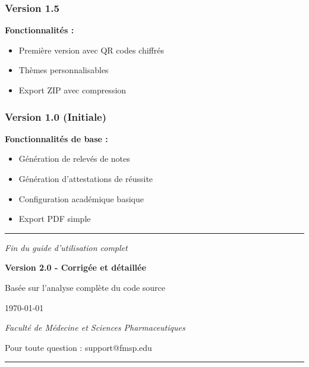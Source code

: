 \subsubsection{Version 1.5}

\textbf{Fonctionnalités :}
\begin{itemize}[leftmargin=*]
    \item Première version avec QR codes chiffrés
    \item Thèmes personnalisables
    \item Export ZIP avec compression
\end{itemize}

\subsubsection{Version 1.0 (Initiale)}

\textbf{Fonctionnalités de base :}
\begin{itemize}[leftmargin=*]
    \item Génération de relevés de notes
    \item Génération d'attestations de réussite
    \item Configuration académique basique
    \item Export PDF simple
\end{itemize}

\vfill

\begin{center}
\rule{\textwidth}{0.4pt}

\vspace{0.5cm}

\textit{Fin du guide d'utilisation complet}

\vspace{0.3cm}

\textbf{Version 2.0 - Corrigée et détaillée}

\vspace{0.2cm}

Basée sur l'analyse complète du code source

\vspace{0.3cm}

\today

\vspace{0.5cm}

\textit{Faculté de Médecine et Sciences Pharmaceutiques}

\vspace{0.2cm}

Pour toute question : support@fmsp.edu

\vspace{0.5cm}

\rule{\textwidth}{0.4pt}
\end{center}


